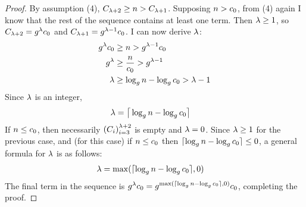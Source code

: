 \begin{proof}
	By assumption (4), $C_{\lambda + 2} \geq n > C_{\lambda + 1}$. Supposing $n > c_0$, from (4) again I know that the rest of the sequence contains at least one term. Then $\lambda \geq 1$, so $C_{\lambda + 2} = g^\lambda c_0$ and $C_{\lambda + 1} = g^{\lambda - 1}c_0$. I can now derive $\lambda$:
	\begin{align*}
	g^\lambda c_0 &\geq n > g^{\lambda - 1}c_0\\
	g^\lambda &\geq \frac{n}{c_0} > g^{\lambda - 1}\\
	\lambda &\geq \log_{g} n - \log_{g} c_0 > \lambda - 1\\
	\end{align*}
	Since $\lambda$ is an integer,
	\begin{align*}
	\lambda &= \big\lceil \log_{g} n - \log_{g} c_0 \big\rceil
	\end{align*}
	If $n \leq c_0$, then necessarily $\left( C_i \right)_{i = 3}^{\lambda + 2}$ is empty and $\lambda = 0$. Since $\lambda \geq 1$ for the previous case, and (for this case) if $n \leq c_0$ then $\lceil \log_{g} n - \log_{g} c_0 \rceil \leq 0$, a general formula for $\lambda$ is as follows:
	\begin{align*}
	\lambda &= \max(\lceil \log_{g} n - \log_{g} c_0 \rceil, 0)
	\end{align*}
	The final term in the sequence is $g^\lambda c_0 = g^{\max(\lceil \log_{g} n - \log_{g} c_0 \rceil, 0)}c_0$, completing the proof.
\end{proof}

